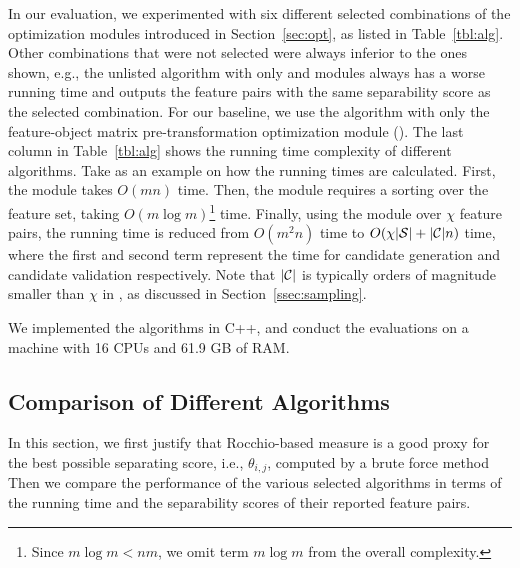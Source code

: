  In our evaluation, we experimented with six different selected combinations of the optimization modules introduced in Section~\ref{sec:opt}, as listed in Table~\ref{tbl:alg}. Other combinations that were not selected were always inferior to the ones shown, e.g., the unlisted algorithm with only \trans and \earlyT modules always has a worse running time and outputs the \topk feature pairs with the same separability score as the selected \earlyOrder combination. For our baseline,  we use the algorithm with only the feature-object matrix pre-transformation optimization module (\trans). The last column in Table~\ref{tbl:alg} shows the running time complexity of different algorithms. Take \horiz as an example on how the running times are calculated. First, the \trans module takes $O(mn)$ time.  Then, the \traversal module requires a sorting over the feature set, taking $O(m\log m)$\footnote{Since $m\log m < nm$, we omit term $m\log m$ from the overall complexity.} time. Finally, using the \sampling module over $\chi$ feature pairs, the running time is reduced from $O(m^2n)$ time to $O(\chi|\sss|+|\cc|n)$ time, where the first and second term represent the time for candidate generation and candidate validation respectively. Note that $|\cc|$ is typically orders of magnitude smaller than $\chi$ in \horiz, as discussed in Section~\ref{ssec:sampling}.

 We implemented the algorithms in C++, and conduct the evaluations on a machine with 16 CPUs and 61.9 GB of RAM.

\subsection{Comparison of Different Algorithms}
\label{sec:exp_comp}

In this section, we first justify that Rocchio-based measure is a good proxy for the best possible separating score, i.e., $\theta_{i,j}$, computed by a brute force method Then we compare the performance of the various selected algorithms in terms of the running time and the separability scores of their \topthousand reported feature pairs.

